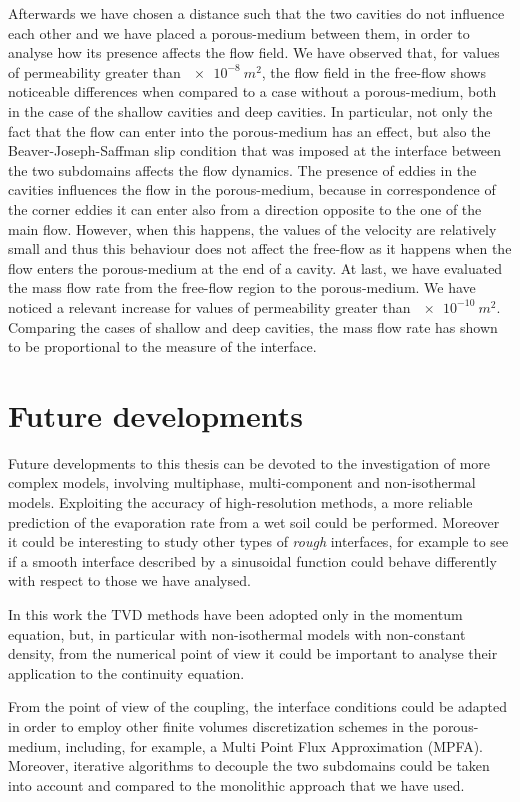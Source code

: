 Afterwards we have chosen a distance such that the two cavities do not 
influence each other and we have placed a porous-medium between them, in order 
to analyse how its presence affects the flow field. We have observed that, 
for values of permeability greater than $\SI{e-8}{m^2}$, the flow field in the 
free-flow shows noticeable differences when compared to a case without a 
porous-medium, both in the case of the shallow cavities and deep cavities.
In particular, not only the fact that the flow can enter into 
the porous-medium has an effect, but also the Beaver-Joseph-Saffman slip 
condition that was imposed at the interface between the two subdomains affects the flow dynamics.
The presence of eddies in the cavities influences the flow in the 
porous-medium, because in correspondence of the corner eddies it can enter also 
from a direction opposite to the one of the main flow. However, when this 
happens, the values of the velocity are relatively small and thus this 
behaviour does not affect the free-flow as it happens when the flow enters the 
porous-medium at the end of a cavity. At last, we have evaluated the mass flow rate from the free-flow region to the porous-medium. We have noticed a relevant increase for values of permeability greater than $\SI{e-10}{m^2}$. Comparing the cases of shallow and deep cavities, the mass flow rate has shown to be proportional to the measure of the interface.
%
\section{Future developments}
Future developments to this thesis can be devoted to the investigation of more 
complex models, involving multiphase, multi-component and non-isothermal 
models. Exploiting the accuracy of high-resolution methods, a more reliable 
prediction of the evaporation rate from a wet soil could be performed. Moreover it could be interesting to study other types of \emph{rough} interfaces, for example to see if a smooth interface described by a sinusoidal function could behave differently with respect to those we have analysed.

In this work the TVD methods have been adopted only in the momentum equation, 
but, in particular with non-isothermal models with non-constant density, from 
the numerical point of view it could be important to analyse their 
application to the continuity equation.

From the point of view of the coupling, the interface conditions could be adapted in order to employ other finite volumes discretization schemes in the porous-medium, including, for example, a Multi Point Flux Approximation (MPFA).
Moreover, iterative algorithms to decouple the two subdomains could be taken into account and compared to the monolithic approach that we have used.

